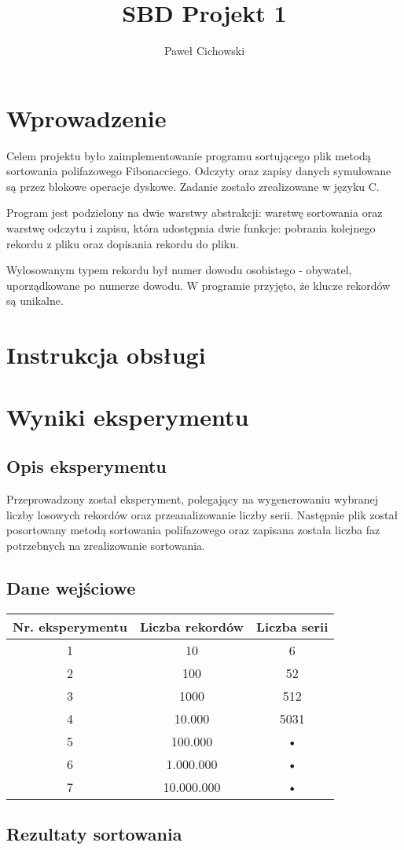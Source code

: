 \documentclass[11pt,a4paper]{article}
\author{Paweł Cichowski}
\date{}
\title{SBD Projekt 1}
\begin{document}
\maketitle

\section{Wprowadzenie}

Celem projektu było zaimplementowanie programu sortującego plik metodą sortowania polifazowego Fibonacciego. Odczyty oraz zapisy danych symulowane są przez blokowe operacje dyskowe. Zadanie zostało zrealizowane w języku C.

Program jest podzielony na dwie warstwy abstrakcji: warstwę sortowania oraz warstwę odczytu i zapisu, która udostępnia dwie funkcje: pobrania kolejnego rekordu z pliku oraz dopisania rekordu do pliku.

Wylosowanym typem rekordu był numer dowodu osobistego - obywatel, uporządkowane po numerze dowodu. W programie przyjęto, że klucze rekordów są unikalne.

\section{Instrukcja obsługi}

\section{Wyniki eksperymentu}

\subsection{Opis eksperymentu}

Przeprowadzony został eksperyment, polegający na wygenerowaniu wybranej liczby losowych rekordów oraz przeanalizowanie liczby serii. Następnie plik został posortowany metodą sortowania polifazowego oraz zapisana została liczba faz potrzebnych na zrealizowanie sortowania.

\subsection{Dane wejściowe}

\begin{tabular}{|c|c|c|}
\hline 
Nr. eksperymentu & Liczba rekordów & Liczba serii \\ 
\hline 
1 & 10 & 6 \\ 
\hline 
2 & 100 & 52 \\ 
\hline 
3 & 1000 & 512 \\
\hline
4 & 10.000 & 5031 \\
\hline 
5 & 100.000 & • \\ 
\hline 
6 & 1.000.000 & • \\ 
\hline 
7 & 10.000.000 & • \\ 
\hline 
\end{tabular} 



\subsection{Rezultaty sortowania}
\end{document}
